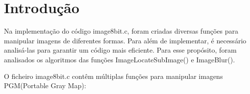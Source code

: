 
\section{Introdução}\label{sec:introducao}

\fontsize{12}{12}\selectfont
    \par Na implementação do código image8bit.c, foram criadas diversas funções para manipular imagens
        de diferentes formas. Para além de implementar, é necessário analisá-las para garantir um 
        código mais eficiente. Para esse propósito, foram analisados os algoritmos das funções
        ImageLocateSubImage() e ImageBlur().

    \par O ficheiro image8bit.c contêm múltiplas funções para manipular imagens PGM(Portable Gray Map):

